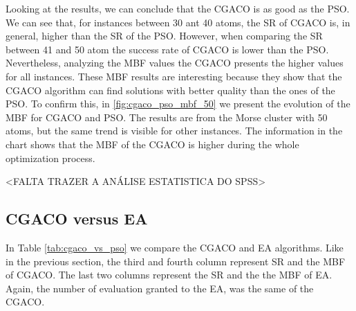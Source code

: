 		Looking at the results, we can conclude that the CGACO is as good as the PSO. We can see that, for instances between 30 ant 40 atoms, the SR of CGACO is, in general, higher than the SR of the PSO. However, when comparing the SR between 41 and 50 atom the success rate of CGACO is lower than the PSO. Nevertheless, analyzing the MBF values the CGACO presents the higher values for all instances. These MBF results are interesting because they show that the CGACO algorithm can find solutions with better quality than the ones of the PSO. To confirm this, in \ref{fig:cgaco_pso_mbf_50} we present the evolution of the MBF for CGACO and PSO. The results are from the Morse cluster with 50 atoms, but the same trend is visible for other instances. The information in the chart shows that the MBF of the CGACO is higher during the whole optimization process.
		
	
	
		<FALTA TRAZER A ANÁLISE ESTATISTICA DO SPSS>
		
		
		\subsection{CGACO versus EA}
		
			In Table \ref{tab:cgaco_vs_pso} we compare the CGACO and EA algorithms. Like in the previous section, the third and fourth column represent SR and the MBF of CGACO. The last two columns represent the SR and the the MBF of EA. Again, the number of evaluation granted to the EA, was the same of the CGACO. 

